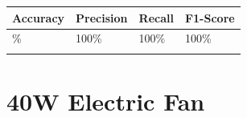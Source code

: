 
{\def\LTcaptype{none} %
\begin{longtable}[]{@{}llll@{}}
\toprule\noalign{}
\textbf{Accuracy} & \textbf{Precision} & \textbf{Recall} &
\textbf{F1-Score} \\
\midrule\noalign{}
\endhead
100\% & 100\% & 100\% & 100\% \\
\bottomrule\noalign{}
\end{longtable}
}

\section{40W Electric Fan}\label{appendix-e.4.-arc-fault-test-result-for-40w-electric-fan}


